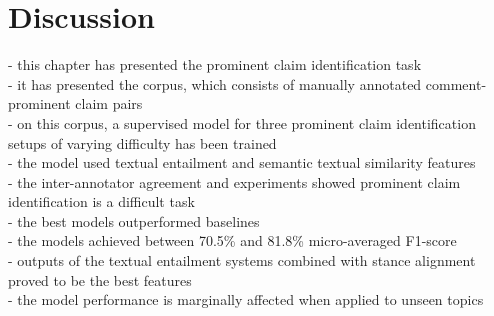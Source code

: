 
\section{Discussion}

- this chapter has presented the prominent claim identification task \\
- it has presented the \ComArg corpus, which consists of manually annotated
comment-prominent claim pairs \\
- on this corpus, a supervised model for three prominent claim identification 
setups of varying difficulty has been trained  \\
- the model used textual entailment and semantic textual similarity features \\
- the inter-annotator agreement  and experiments showed prominent claim identification
is a difficult task \\
- the best models outperformed baselines \\
- the models achieved between 70.5\% and 81.8\% micro-averaged F1-score \\
- outputs of the textual entailment systems combined with stance alignment proved
to be the best features \\
- the model performance is marginally affected when applied to unseen topics \\
